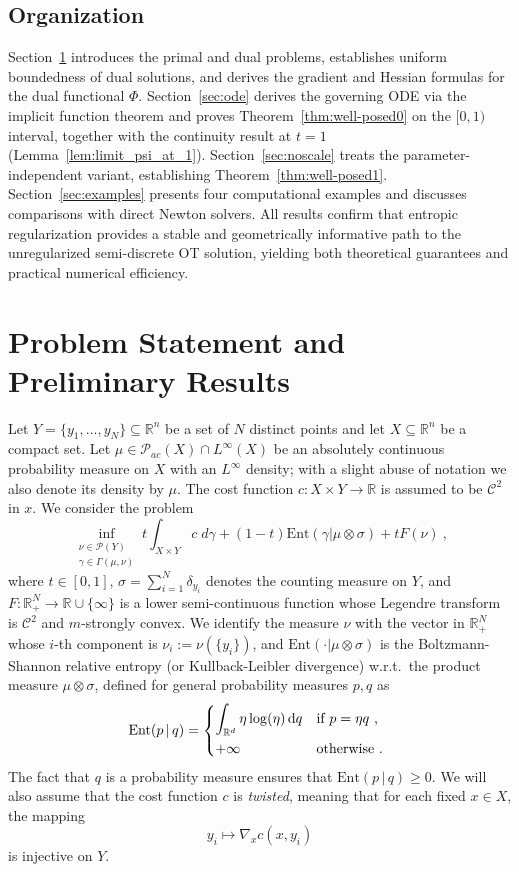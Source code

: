 \documentclass{scrartcl}
\newcommand{\dd}{\mathrm d}
\newcommand{\R}{{\mathbb R}}
\theoremstyle{plain}
\theoremstyle{definition}
\begin{document}
\subsection*{Organization}

Section~\ref{sec:prelim} introduces the primal and dual problems, establishes uniform boundedness of dual solutions, and derives the gradient and Hessian formulas for the dual functional $\Phi$. Section~\ref{sec:ode} derives the governing ODE via the implicit function theorem and proves Theorem~\ref{thm:well-posed0} on the $[0,1)$ interval, together with the continuity result at $t = 1$ (Lemma~\ref{lem:limit_psi_at_1}). Section~\ref{sec:noscale} treats the parameter-independent variant, establishing Theorem~\ref{thm:well-posed1}. Section~\ref{sec:examples} presents four computational examples and discusses comparisons with direct Newton solvers. All results confirm that entropic regularization provides a stable and geometrically informative path to the unregularized semi-discrete OT solution, yielding both theoretical guarantees and practical numerical efficiency.



\section{Problem Statement and Preliminary Results}\label{sec:prelim}
Let $Y=\{y_1,\dots,y_N\}\subseteq \R^n$ be a set of $N$ distinct points and let $X\subseteq \R^n$ be a compact  set. 
Let $\mu\in\mathcal{P}_{ac}(X)\cap L^{\infty}(X)$ be an absolutely continuous probability measure on $X$ with an $L^{\infty}$ density; with a slight abuse of notation we also denote its density by $\mu$. The cost function $c:X\times Y\to\R$ is assumed to be $\mathcal{C}^2$  in $x$. We consider the problem
\begin{equation}\label{eq:primal}
    \boxed{\inf_{\substack{\nu\in\mathcal{P}(Y)\\\gamma\in\Gamma(\mu,\nu)}} t\int_{X\times Y} c\;d\gamma + (1-t)\mathrm{Ent}(\gamma|\mu\otimes\sigma) +tF(\nu)\ ,}
\end{equation}
where $t\in[0,1]$, $\sigma=\sum_{i=1}^N\delta_{y_i}$ denotes the counting measure on $Y$, and $F:\R_+^N\to\R\cup\{\infty\}$ is a lower semi-continuous function whose Legendre transform is $\mathcal C^2$ and $m$-strongly convex. We identify the measure $\nu$ with the vector in $\R_+^N$ whose $i$-th component is $\nu_i:=\nu(\{y_i\})$, and $\mathrm{Ent}(\cdot|\mu \otimes \sigma)$ is the Boltzmann-Shannon relative entropy (or Kullback-Leibler divergence) w.r.t.\ the product measure $\mu \otimes \sigma$, defined for general probability measures $p,q$ as
\[
    \mathrm{Ent}(p \,|\, q) = 
    \begin{dcases*}
        \int_{\R^d} \eta \log(\eta)\, \dd q & \text{if $p = \eta q$}\ ,\\
        +\infty & \text{otherwise}\ .
    \end{dcases*}
\]
The fact that $q$ is a probability measure ensures that $\mathrm{Ent}(p \,|\, q) \geq 0$.
 We will also assume that the cost function $c$ is \emph{twisted}, meaning that for each fixed $x \in X$, the mapping 
$$
y_i \mapsto \nabla_xc(x,y_i)
$$
is injective on $Y$.
\end{document}
